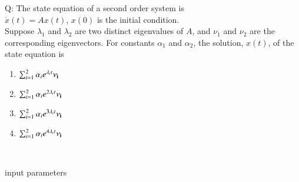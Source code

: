 \documentclass[journal,12pt,onecolumn]{IEEEtran}
\theoremstyle{remark}
\begin{document}
\let\vec\mathbf







\bigskip


Q: The state equation of a second order system is \\
$ \dot{{x}}(t) = A{x}(t)$, \quad ${x}(0)$ is the initial condition. \\
Suppose $\lambda_1$ and $\lambda_2$ are two distinct eigenvalues of $A$, and $\nu_1$ and $\nu_2$ are the corresponding eigenvectors. For constants $\alpha_1$ and $\alpha_2$, the solution, ${x}(t)$, of the state equation is \\
\begin{enumerate}[label=(\Alph*)]
\item $\sum_{i=1}^{2} \alpha_ie^{\lambda_it}\bf{\nu}_i$
\item $\sum_{i=1}^{2} \alpha_ie^{2\lambda_it}\bf{\nu}_i$
\item $\sum_{i=1}^{2} \alpha_ie^{3\lambda_it}\bf{\nu}_i$
\item $\sum_{i=1}^{2} \alpha_ie^{4\lambda_it}\bf{\nu}_i$
\end{enumerate}


\solution \\
\begin{table}[!ht]
    \centering
        
    \caption{input parameters}
    \label{tab:gate23EC43.1}
\end{table}
\end{document}
